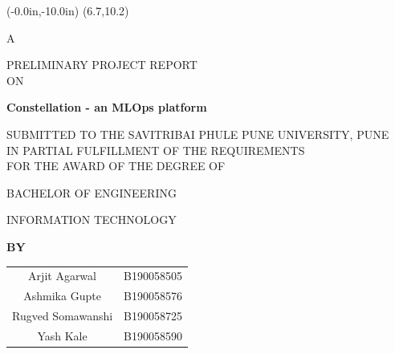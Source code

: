 \documentclass[12pt,a4paper]{report}     %
\begin{document}
\newpage
\pagestyle{plain}
\pagestyle{empty}
\pagestyle{fancy}							%
\renewcommand{\headrulewidth}{0pt}


	\thisfancyput(-0.0in,-10.0in){%
\setlength{\unitlength}{1in}\framebox(6.7,10.2)}
\begin{center}
      
      \begin{center} {A} \end{center}
      \vspace{0.2 in}
      { PRELIMINARY PROJECT REPORT}
      \vspace{0.2 in}\\
       ON
			\end{center}
	\begin{center}
	    \vspace{0.1 in}
		\textbf{\large  Constellation - an MLOps platform  } %
		\vspace{0.2 in}
	\end{center}
     \vspace{0.2 in}
		\begin{center}
	    SUBMITTED TO THE SAVITRIBAI PHULE PUNE UNIVERSITY, PUNE \\
	    IN PARTIAL FULFILLMENT OF THE REQUIREMENTS\\
	    FOR THE AWARD OF THE DEGREE OF
	\end{center}
	\vspace{0.1 in}
	
	\begin{center}
	   {BACHELOR OF ENGINEERING}\\
	    \begin{small}{ INFORMATION TECHNOLOGY}
\end{small}	\end{center}
	\vspace{0.1 in}
	
	\begin{center}
	   \textbf{BY}
	\end{center}
	\vspace{0.1 in}
	
	\begin{center}
\begin{tabular}{ c c }
    
    Arjit Agarwal & B190058505 \\
    Ashmika Gupte & B190058576 \\
    Rugved Somawanshi & B190058725 \\
    Yash Kale & B190058590 \\
\end{tabular}
 
	\end{center}
	\vspace{0.1 in}
	
\end{document}
